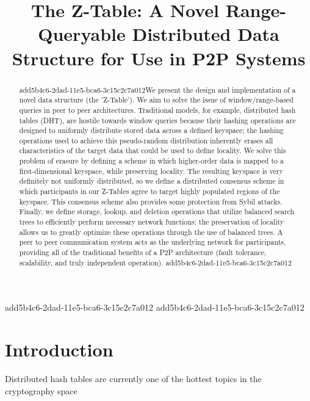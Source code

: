 \documentclass[12pt]{article}
\title{The Z-Table: A Novel Range-Queryable Distributed Data Structure for Use in P2P Systems}
\begin{document}
\maketitle
add5b4c6-2dad-11e5-bca6-3c15c2c7a012
add5b4c6-2dad-11e5-bca6-3c15c2c7a012\begin{abstract}
add5b4c6-2dad-11e5-bca6-3c15c2c7a012We present the design and implementation of a novel data structure (the 'Z-Table'). We aim to solve the issue of window/range-based queries in peer to peer architectures. Traditional models, for example,  distributed hash tables (DHT), are hostile towards window queries because their hashing operations are designed to uniformly distribute stored data across a defined keyspace; the hashing operations used to achieve this pseudo-random distribution inherently erases all characteristics of the target data that could be used to define locality. We solve this problem of erasure by defining a scheme in which higher-order data is mapped to a first-dimensional keyspace, while preserving locality. The resulting keyspace is very definitely not uniformly distributed, so we define a distributed consensus scheme in which participants in our Z-Tables agree to target highly populated regions of the keyspace. This consensus scheme also provides some protection from Sybil attacks. Finally, we define storage, lookup, and deletion operations that utilize balanced search trees to efficiently perform necessary network functions; the preservation of locality allows us to greatly optimize these operations through the use of balanced trees. A peer to peer communication system acts as the underlying network for participants, providing all of the traditional benefits of a P2P architecture (fault tolerance, scalability, and truly independent operation).
add5b4c6-2dad-11e5-bca6-3c15c2c7a012\end{abstract}


\newpage
\section{Introduction}
Distributed hash tables are currently one of the hottest topics in the cryptography space~\cite{Stoica:2001dj,Rowstron:2001ea,Ratnasamy:2001wn}

\printbibliography
\end{document}
